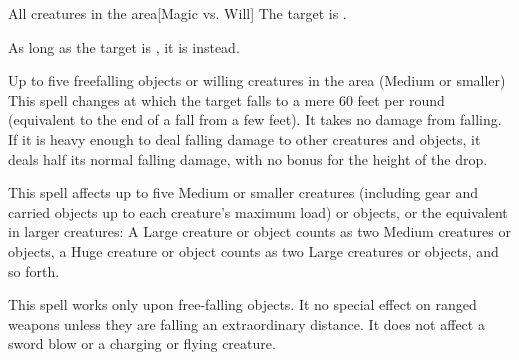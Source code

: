 \begin{spellheader}
    \spelldur{\durshort \dismissable}
\end{spellheader}
\begin{spelleffects}
    \begin{spelltarget}{All creatures in the area}[Magic vs. Will]
        \spellsuccess The target is \shaken.

        As long as the target is \bloodied, it is \frightened instead.
    \end{spelltarget}
\end{spelleffects}
\begin{spellfooter}
    
\end{spellfooter}

\begin{spellheader}
\end{spellheader}
\begin{spelleffects}
    \begin{spelltargets}{Up to five freefalling objects or willing creatures in the area (Medium or smaller)}
        \spelleffect This spell changes at which the target falls to a mere 60 feet per round (equivalent to the end of a fall from a few feet). It takes no damage from falling. If it is heavy enough to deal falling damage to other creatures and objects, it deals half its normal falling damage, with no bonus for the height of the drop.
    \end{spelltargets}
\end{spelleffects}
\begin{spellfooter}
    \spellnotes This spell affects up to five Medium or smaller creatures (including gear and carried objects up to each creature's maximum load) or objects, or the equivalent in larger creatures: A Large creature or object counts as two Medium creatures or objects, a Huge creature or object counts as two Large creatures or objects, and so forth.

    This spell works only upon free-falling objects. It no special effect on ranged weapons unless they are falling an extraordinary distance. It does not affect a sword blow or a charging or flying creature.
\end{spellfooter}

